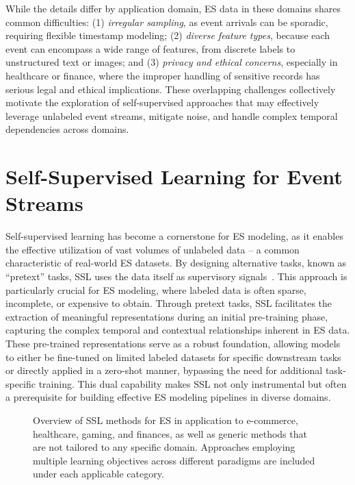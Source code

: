 \documentclass[twoside,11pt]{article}
\begin{document}
While the details differ by application domain, ES data in these domains shares common difficulties: (1) \textit{irregular sampling}, as event arrivals can be sporadic, requiring flexible timestamp modeling; (2) \textit{diverse feature types}, because each event can encompass a wide range of features, from discrete labels to unstructured text or images; and (3) \textit{privacy and ethical concerns}, especially in healthcare or finance, where the improper handling of sensitive records has serious legal and ethical implications. These overlapping challenges collectively motivate the exploration of self-supervised approaches that may effectively leverage unlabeled event streams, mitigate noise, and handle complex temporal dependencies across domains.

\section{Self-Supervised Learning for Event Streams}
\label{sec:ssl-es-review}
Self-supervised learning has become a cornerstone for ES modeling, as it enables the effective utilization of vast volumes of unlabeled data -- a common characteristic of real-world ES datasets. By designing alternative tasks, known as ``pretext'' tasks, SSL uses the data itself as supervisory signals~. This approach is particularly crucial for ES modeling, where labeled data is often sparse, incomplete, or expensive to obtain. Through pretext tasks, SSL facilitates the extraction of meaningful representations during an initial pre-training phase, capturing the complex temporal and contextual relationships inherent in ES data. These pre-trained representations serve as a robust foundation, allowing models to either be fine-tuned on limited labeled datasets for specific downstream tasks or directly applied in a zero-shot manner, bypassing the need for additional task-specific training. This dual capability makes SSL not only instrumental but often a prerequisite for building effective ES modeling pipelines in diverse domains.

\begin{figure}[ht!]
    \centering
    
    \caption{Overview of SSL methods for ES in application to \textcolor{cbBlue}{e-commerce}, \textcolor{cbGreen}{healthcare}, \textcolor{cbOrange}{gaming}, and \textcolor{cbRed}{finances}, as well as generic methods that are not tailored to any specific domain. Approaches employing multiple learning objectives across different paradigms are included under each applicable category.}
    \label{fig:ssles-tree-diagram}
\end{figure}
\end{document}

